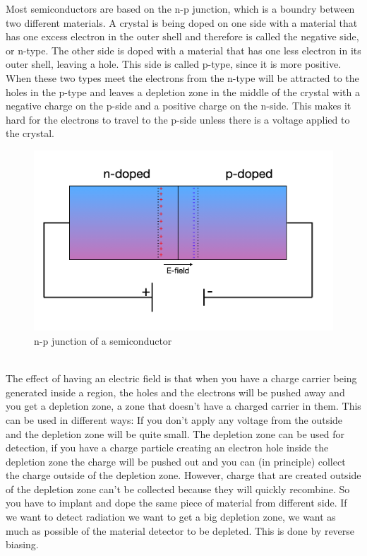 \documentclass[twoside,english]{uiofysmaster/uiofysmaster}
\begin{document}
Most semiconductors are based on the n-p junction, which is a boundry between two different materials. A crystal is being doped on one side with a material that has one excess electron in the outer shell and therefore is called the negative side, or n-type. The other side is doped with a material that has one less electron in its outer shell, leaving a hole. This side is called p-type, since it is more positive. When these two types meet the electrons from the n-type will be attracted to the holes in the p-type and leaves a depletion zone in the middle of the crystal with a negative charge on the p-side and a positive charge on the n-side. This makes it hard for the electrons to travel to the p-side unless there is a voltage applied to the crystal. \\
\begin{figure}[h!]
    \centering
     \includegraphics[scale=0.3]{semiconductor.png}
     \caption{n-p junction of a semiconductor} 
    \label{fig:n-p_junction}
\end{figure}
\noindent
\\
The effect of having an electric field is that  when you have a charge carrier being generated inside a region, the holes and the electrons will be pushed away and you get a depletion zone, a zone that doesn’t have a charged carrier in them. This can be used in different ways: If you don’t apply any voltage from the outside and the depletion zone will be quite small. The depletion zone can be used for detection, if you have a charge particle creating an electron hole inside the depletion zone the charge will be pushed out and you can (in principle) collect the charge outside of the depletion zone. However, charge that are created outside of the depletion zone can’t be collected because they will quickly recombine. So you have to implant and dope the same piece of material from different side. If we want to detect radiation we want to get a big depletion zone, we want as much as possible of the material detector to be depleted. This is done by reverse biasing.
\end{document}
